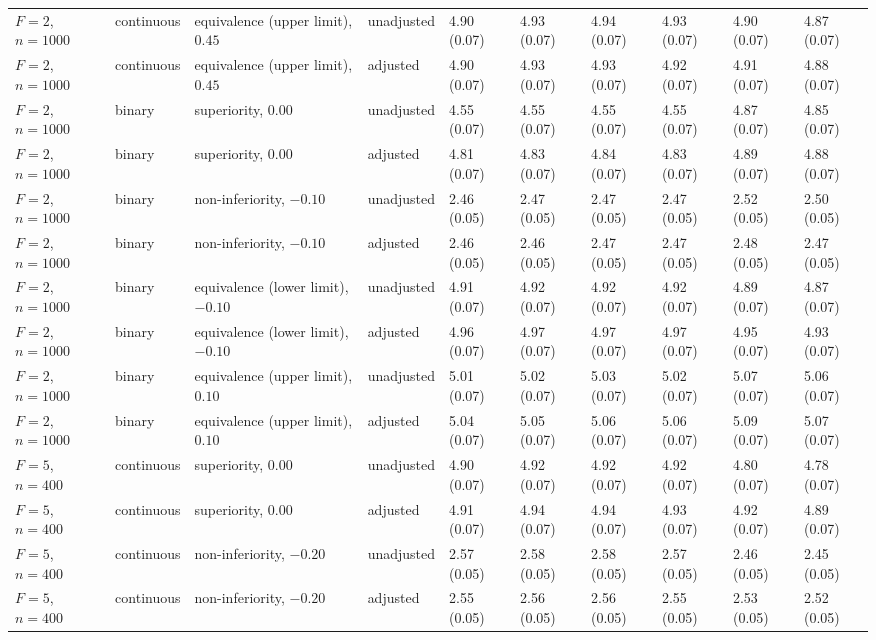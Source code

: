 \begin{landscape}
\begin{singlespace}
\begin{longtable}{@{}llllllllll@{}}
$F=2$, $n=1000$ & continuous & equivalence (upper limit), $0.45$ & unadjusted & 4.90 (0.07) & 4.93 (0.07) & 4.94 (0.07) & 4.93 (0.07) & 4.90 (0.07) & 4.87 (0.07)\\
$F=2$, $n=1000$ & continuous & equivalence (upper limit), $0.45$ & adjusted & 4.90 (0.07) & 4.93 (0.07) & 4.93 (0.07) & 4.92 (0.07) & 4.91 (0.07) & 4.88 (0.07)\\
$F=2$, $n=1000$ & binary & superiority, $0.00$ & unadjusted & 4.55 (0.07) & 4.55 (0.07) & 4.55 (0.07) & 4.55 (0.07) & 4.87 (0.07) & 4.85 (0.07)\\
$F=2$, $n=1000$ & binary & superiority, $0.00$ & adjusted & 4.81 (0.07) & 4.83 (0.07) & 4.84 (0.07) & 4.83 (0.07) & 4.89 (0.07) & 4.88 (0.07)\\
$F=2$, $n=1000$ & binary & non-inferiority, $-0.10$ & unadjusted & 2.46 (0.05) & 2.47 (0.05) & 2.47 (0.05) & 2.47 (0.05) & 2.52 (0.05) & 2.50 (0.05)\\
$F=2$, $n=1000$ & binary & non-inferiority, $-0.10$ & adjusted & 2.46 (0.05) & 2.46 (0.05) & 2.47 (0.05) & 2.47 (0.05) & 2.48 (0.05) & 2.47 (0.05)\\
$F=2$, $n=1000$ & binary & equivalence (lower limit), $-0.10$ & unadjusted & 4.91 (0.07) & 4.92 (0.07) & 4.92 (0.07) & 4.92 (0.07) & 4.89 (0.07) & 4.87 (0.07)\\
$F=2$, $n=1000$ & binary & equivalence (lower limit), $-0.10$ & adjusted & 4.96 (0.07) & 4.97 (0.07) & 4.97 (0.07) & 4.97 (0.07) & 4.95 (0.07) & 4.93 (0.07)\\
$F=2$, $n=1000$ & binary & equivalence (upper limit), $0.10$ & unadjusted & 5.01 (0.07) & 5.02 (0.07) & 5.03 (0.07) & 5.02 (0.07) & 5.07 (0.07) & 5.06 (0.07)\\
$F=2$, $n=1000$ & binary & equivalence (upper limit), $0.10$ & adjusted & 5.04 (0.07) & 5.05 (0.07) & 5.06 (0.07) & 5.06 (0.07) & 5.09 (0.07) & 5.07 (0.07)\\
$F=5$, $n=400$ & continuous & superiority, $0.00$ & unadjusted & 4.90 (0.07) & 4.92 (0.07) & 4.92 (0.07) & 4.92 (0.07) & 4.80 (0.07) & 4.78 (0.07)\\
$F=5$, $n=400$ & continuous & superiority, $0.00$ & adjusted & 4.91 (0.07) & 4.94 (0.07) & 4.94 (0.07) & 4.93 (0.07) & 4.92 (0.07) & 4.89 (0.07)\\
$F=5$, $n=400$ & continuous & non-inferiority, $-0.20$ & unadjusted & 2.57 (0.05) & 2.58 (0.05) & 2.58 (0.05) & 2.57 (0.05) & 2.46 (0.05) & 2.45 (0.05)\\
$F=5$, $n=400$ & continuous & non-inferiority, $-0.20$ & adjusted & 2.55 (0.05) & 2.56 (0.05) & 2.56 (0.05) & 2.55 (0.05) & 2.53 (0.05) & 2.52 (0.05)\\

\end{longtable}
\end{singlespace}
\end{landscape}
